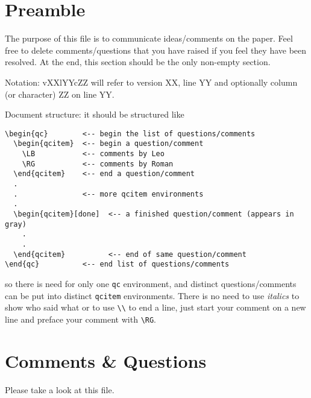 \documentclass[a4paper]{amsart}
\begin{document}
\section{Preamble}
\label{sec:pre}
The purpose of this file is to communicate ideas/comments on the
paper. Feel free to delete comments/questions that you have raised if
you feel they have been resolved. At the end, this section should be
the only non-empty section.

Notation: vXXlYYcZZ will refer to version XX, line YY and optionally
column (or character) ZZ on line YY.

Document structure: it should be structured like
\begin{verbatim}
\begin{qc}        <-- begin the list of questions/comments
  \begin{qcitem}  <-- begin a question/comment
    \LB           <-- comments by Leo
    \RG           <-- comments by Roman
  \end{qcitem}    <-- end a question/comment
  .
  .               <-- more qcitem environments
  .
  \begin{qcitem}[done]  <-- a finished question/comment (appears in gray)
    .
    .
  \end{qcitem}          <-- end of same question/comment
\end{qc}          <-- end list of questions/comments
\end{verbatim}
so there is need for only one \verb#qc# environment, and distinct
questions/comments can be put into distinct \verb#qcitem#
environments. There is no need to use {\it italics} to show who said
what or to use \verb#\\# to end a line, just start your comment on a
new line and preface your comment with \verb#\RG#.

\section{Comments \& Questions}
\label{sec:cq}
\begin{qc}
  \begin{qcitem}
    \LB Please take a look at this file.
  \end{qcitem}
\end{qc}



\end{document}
